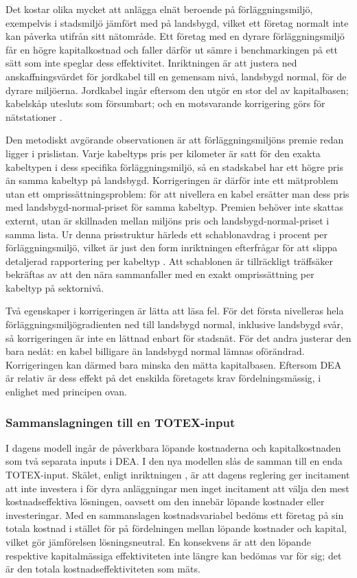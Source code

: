 \documentclass[11pt,a4paper]{article}
\begin{document}
Det kostar olika mycket att anlägga elnät beroende på förläggningsmiljö, exempelvis i stadsmiljö
jämfört med på landsbygd, vilket ett företag normalt inte kan påverka utifrån sitt nätområde. Ett
företag med en dyrare förläggningsmiljö får en högre kapitalkostnad och faller därför ut sämre i
benchmarkingen på ett sätt som inte speglar dess effektivitet. Inriktningen är att justera ned
anskaffningsvärdet för jordkabel till en gemensam nivå, landsbygd normal, för de dyrare miljöerna.
Jordkabel ingår eftersom den utgör en stor del av kapitalbasen; kabelskåp utesluts som
försumbart; och en motsvarande korrigering görs för nätstationer \citeyearpar{Ei2025Benchmarking}.

Den metodiskt avgörande observationen är att förläggningsmiljöns premie redan ligger i prislistan.
Varje kabeltyps pris per kilometer är satt för den exakta kabeltypen i dess specifika
förläggningsmiljö, så en stadskabel har ett högre pris än samma kabeltyp på landsbygd.
Korrigeringen är därför inte ett mätproblem utan ett omprissättningsproblem: för att nivellera en
kabel ersätter man dess pris med landsbygd-normal-priset för samma kabeltyp. Premien behöver inte
skattas externt, utan är skillnaden mellan miljöns pris och landsbygd-normal-priset i samma lista.
Ur denna prisstruktur härleds ett schablonavdrag i procent per förläggningsmiljö, vilket är just
den form inriktningen efterfrågar för att slippa detaljerad rapportering per kabeltyp \citeyearpar{Ei2025Benchmarking}. Att
schablonen är tillräckligt träffsäker bekräftas av att den nära sammanfaller med en exakt
omprissättning per kabeltyp på sektornivå.

Två egenskaper i korrigeringen är lätta att läsa fel. För det första nivelleras hela
förläggningsmiljögradienten ned till landsbygd normal, inklusive landsbygd svår, så korrigeringen
är inte en lättnad enbart för stadsnät. För det andra justerar den bara nedåt: en kabel billigare
än landsbygd normal lämnas oförändrad. Korrigeringen kan därmed bara minska den mätta
kapitalbasen. Eftersom DEA är relativ är dess effekt på det enskilda företagets krav
fördelningsmässig, i enlighet med principen ovan.

\subsubsection{Sammanslagningen till en TOTEX-input}

I dagens modell ingår de påverkbara löpande kostnaderna och kapitalkostnaden som två separata
inputs i DEA. I den nya modellen slås de samman till en enda TOTEX-input. Skälet, enligt
inriktningen \citeyearpar{Ei2025Benchmarking}, är att dagens reglering ger incitament att inte investera i för dyra anläggningar men
inget incitament att välja den mest kostnadseffektiva lösningen, oavsett om den innebär löpande
kostnader eller investeringar. Med en sammanslagen kostnadsvariabel bedöms ett företag på sin
totala kostnad i stället för på fördelningen mellan löpande kostnader och kapital, vilket gör
jämförelsen lösningsneutral. En konsekvens är att den löpande respektive kapitalmässiga
effektiviteten inte längre kan bedömas var för sig; det är den totala kostnadseffektiviteten som
mäts.
\end{document}
